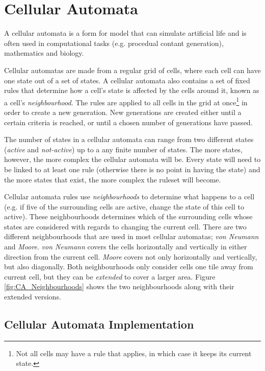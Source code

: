 \section{Cellular Automata}
\label{methodology_ca}
A cellular automata is a form for model that can simulate artificial life and is often used in computational tasks (e.g. procedual contant generation\cite{togelius2011search}), mathematics and biology. 

Cellular automatas are made from a regular grid of cells, where each cell can have one state out of a set of states. A cellular automata also contains a set of fixed rules that determine how a cell's state is affected by the cells around it, known as a cell's \textit{neighbourhood}. The rules are applied to all cells in the grid at once\footnote{Not all cells may have a rule that applies, in which case it keeps its current state.} in order to create a new generation. New generations are created either until a certain criteria is reached, or until a chosen number of generations have passed.

The number of states in a cellular automata can range from two different states (\textit{active} and \textit{not-active}) up to a any finite number of states. The more states, however, the more complex the cellular automata will be. Every state will need to be linked to at least one rule (otherwise there is no point in having the state) and the more states that exist, the more complex the ruleset will become.

Cellular automata rules use \textit{neighbourhoods} to determine what happens to a cell (e.g. if five of the surrounding cells are active, change the state of this cell to active). These neighbourhoods determines which of the surrounding cells whose states are considered with regards to changing the current cell. There are two different neighbourhoods that are used in most cellular automatas; \textit{von Neumann} and \textit{Moore}. \textit{von Neumann} covers the cells horizontally and vertically in either direction from the current cell. \textit{Moore} covers not only horizontally and vertically, but also diagonally. Both neighbourhoods only consider cells one tile away from current cell, but they can be \textit{extended} to cover a larger area. Figure \ref{fig:CA_Neighbourhoods} shows the two neighbourhoods along with their extended versions.


\subsection{Cellular Automata Implementation}
\label{methodology_ca_our}

